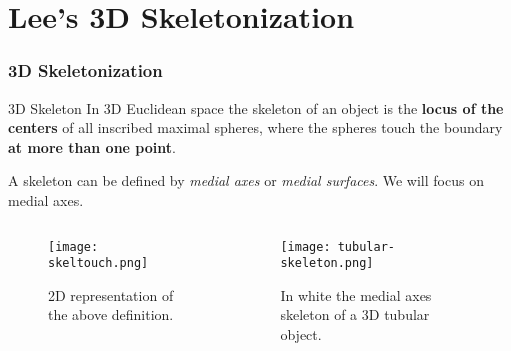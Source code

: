 \section{Lee's 3D Skeletonization}

\begin{frame}
  \frametitle{3D Skeletonization}
  \begin{block}
    {3D Skeleton}
    In 3D Euclidean space the skeleton of an object is the \textbf{locus of the centers} of all inscribed maximal spheres, where the spheres touch the boundary \textbf{at more than one point}.
  \end{block}
  A skeleton can be defined by \emph{medial axes} or \emph{medial surfaces}. We will focus on medial axes.
  \begin{columns}
    \begin{column}{0.5\textwidth}
      \begin{figure}
        \texttt{[image: skeltouch.png]}
        \caption{2D representation of the above definition.}
      \end{figure}
    \end{column}
    \begin{column}{0.5\textwidth}
      \begin{figure}
        \texttt{[image: tubular-skeleton.png]}
        \caption{In white the medial axes skeleton of a 3D tubular object.}
      \end{figure}
    \end{column}
  \end{columns}
\end{frame}

